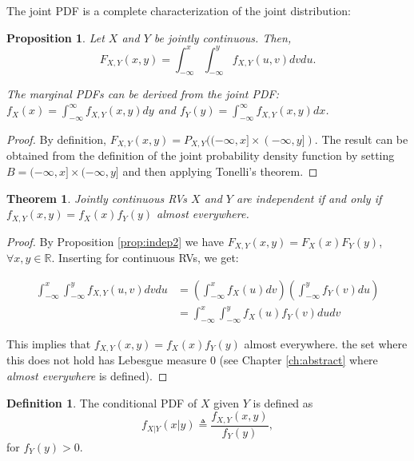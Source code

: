 \documentclass{book}
\theoremstyle{plain}%
\newtheorem{theorem}{Theorem}[section]
\newtheorem{proposition}{Proposition}[section]
\theoremstyle{definition}
\newtheorem{definition}{Definition}[section]
\begin{document}
The joint PDF is a complete characterization of the joint distribution:

\begin{proposition}
Let $X$ and $Y$ be jointly continuous. Then,
$$F_{X,Y}(x,y) = \int_{-\infty}^x \int_{-\infty}^y f_{X,Y}(u,v)dvdu.$$

The marginal PDFs can be derived from the joint PDF: $f_X(x) = \int_{-\infty}^\infty f_{X,Y}(x,y)dy$ and $f_Y(y) = \int_{-\infty}^\infty f_{X,Y}(x,y)dx$.
\end{proposition}

\begin{proof}
 By definition, $F_{X,Y}(x,y) = P_{X,Y}((-\infty, x] \times (-\infty, y])$. The result can be obtained from the definition of the joint probability density function by setting $B = (-\infty, x] \times (-\infty, y]$ and then applying Tonelli's theorem.
\end{proof}

\begin{theorem}
Jointly continuous RVs $X$ and $Y$ are independent if and only if $f_{X,Y}(x,y) = f_X(x)f_Y(y)$ almost everywhere.
\end{theorem}

\begin{proof}
By Proposition \ref{prop:indep2} we have $F_{X,Y}(x,y) = F_X(x)F_Y(y)$, $\forall x,y \in \mathbb{R}$. Inserting for continuous RVs, we get:

\begin{align*}
\int_{-\infty}^x \int_{-\infty}^y f_{X,Y}(u,v)dv du &= \left(\int_{-\infty}^x f_{X}(u)dv\right)\left( \int_{-\infty}^y f_{Y}(v)du\right)\\
&= \int_{-\infty}^x \int_{-\infty}^y f_{X}(u) f_{Y}(v)du dv
\end{align*}

This implies that $f_{X,Y}(x,y) = f_{X}(x)f_{Y}(y)$ almost everywhere. the set where this does not hold has Lebesgue measure 0 (see Chapter \ref{ch:abstract} where \emph{almost everywhere} is defined).
\end{proof}

\begin{definition}
The conditional PDF of $X$ given $Y$ is defined as
$$f_{X|Y}(x|y) \triangleq \frac{f_{X,Y}(x,y)}{f_Y(y)},$$
for $f_Y(y) > 0$.
\end{definition}

\end{document}
